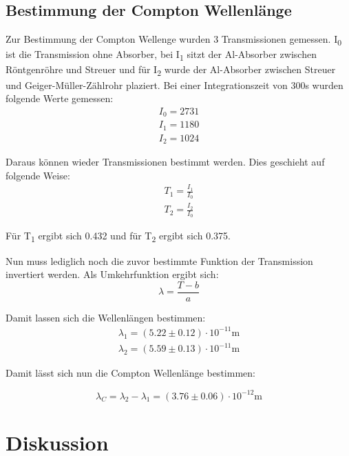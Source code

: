 \subsection{Bestimmung der Compton Wellenlänge}

Zur Bestimmung der Compton Wellenge wurden 3 Transmissionen gemessen. I\textsubscript{0} ist die Transmission ohne Absorber, bei I\textsubscript{1} sitzt der Al-Absorber zwischen Röntgenröhre und Streuer und für I\textsubscript{2} wurde der Al-Absorber zwischen Streuer und Geiger-Müller-Zählrohr plaziert. Bei einer Integrationszeit von 300s wurden folgende Werte gemessen:
\begin{align}
    I_0 = 2731 \nonumber \\
    I_1 = 1180 \nonumber \\
    I_2 = 1024 \nonumber
\end{align}

Daraus können wieder Transmissionen bestimmt werden. Dies geschieht auf folgende Weise:
\begin{align}
    T_1 = \frac{I_1}{I_0} \nonumber \\
    T_2 = \frac{I_2}{I_0} \nonumber
\end{align}

\noindent Für T\textsubscript{1} ergibt sich 0.432 und für T\textsubscript{2} ergibt sich 0.375.

Nun muss lediglich noch die zuvor bestimmte Funktion der Transmission invertiert werden. Als Umkehrfunktion ergibt sich:
\begin{displaymath}
    \lambda = \frac{T-b}{a}
\end{displaymath}

\noindent Damit lassen sich die Wellenlängen bestimmen:
\begin{align}
    \lambda_1 = (5.22\pm 0.12)\cdot 10^{-11} \text{m} \nonumber \\
    \lambda_2 = (5.59\pm 0.13)\cdot 10^{-11} \text{m} \nonumber
\end{align}

Damit lässt sich nun die Compton Wellenlänge bestimmen:

\begin{displaymath}
    \lambda_C = \lambda_2-\lambda_1 = (3.76\pm 0.06)\cdot 10^{-12} \text{m}
\end{displaymath}

\section{Diskussion}

